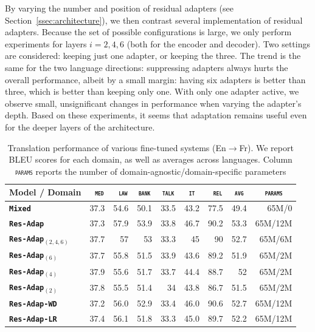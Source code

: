 \documentclass[11pt,a4paper]{article}
\newcommand{\fyDone}[1]{\done[FY]\Todo[FY:]{\textcolor{orange}{#1}}}
\newcommand{\fyFuture}[1]{\done[FY]\Todo[FY:]{\textcolor{red}{#1}}}
\newcommand{\domain}[1]{\texttt{\textsc{#1}}}
\newcommand{\system}[1]{\texttt{\textbf{#1}}}
\begin{document}
By varying the number and position of residual adapters (see Section~\ref{ssec:architecture}), we then contrast several implementation of residual adapters. \fyDone{Fix style here} Because the set of possible configurations is large, we only perform experiments for layers $i= 2, 4, 6$ (both for the encoder and decoder). Two settings are considered: keeping just one adapter, or keeping the three. The trend is the same for the two language directions: suppressing adapters always hurts the overall performance, albeit by a small margin: having six adapters is better than three, which is better than keeping only one. With only one adapter active, we observe small, unsignificant changes in performance when varying the adapter's depth. Based on these experiments, it seems that adaptation remains useful even for the deeper layers of the architecture.\fyFuture{More configuration ?}

\begin{table}[htbp]
  \centering
  \begin{tabular}{|p{3cm}|*{8}{r|}} \hline
    Model / Domain & \multicolumn{1}{c|}{\domain{ med}} & \multicolumn{1}{c|}{\domain{ law}} & \multicolumn{1}{c|}{\domain{bank}} & \multicolumn{1}{c|}{\domain{talk}} & \multicolumn{1}{c|}{\domain{ it }} & \multicolumn{1}{c|}{\domain{ rel}} & \multicolumn{1}{c|}{\domain{avg}} & \multicolumn{1}{c|}{\domain{params}} \\ \hline 
    \system{Mixed}  & 37.3 & 54.6 & 50.1 & 33.5 & 43.2 & 77.5  & 49.4 & 65M/0 \\
    \system{Res-Adap}     & 37.3 & 57.9 & 53.9 & 33.8 & 46.7 & 90.2 & 53.3 & 65M/12M\\ \hline
    \system{Res-Adap$_{(2,4,6)}$}     & 37.7 & 57 & 53 & 33.3 & 45 & 90 & 52.7 & 65M/6M\\
    \system{Res-Adap$_{(6)}$}     & 37.7 & 55.8 & 51.5 & 33.9 & 43.6 & 89.2 & 51.9 & 65M/2M \\
    \system{Res-Adap$_{(4)}$}     & 37.9 & 55.6 & 51.7 & 33.7 & 44.4 & 88.7 & 52 & 65M/2M\\
    \system{Res-Adap$_{(2)}$}     & 37.8 & 55.5 & 51.4 & 34 & 43.8 & 86.7 & 51.5 & 65M/2M\\ \hline
    \system{Res-Adap-WD}     & 37.2 & 56.0 & 52.9 & 33.4 & 46.0 & 90.6 & 52.7 & 65M/12M \\
    \system{Res-Adap-LR}      & 37.4 & 56.1 & 51.8 & 33.3 & 45.0 & 89.7 & 52.2 & 65M/12M \\  
     \hline
  \end{tabular}
  \caption{Translation performance of various fine-tuned systems (En$\rightarrow$Fr). We report BLEU scores for each domain, as well as averages across languages. Column \domain{params} reports the number of domain-agnostic/domain-specific parameters \label{tab:performance-en-fr-pos-reg}} \fyDone{Boldface ?}
\end{table}
\end{document}
